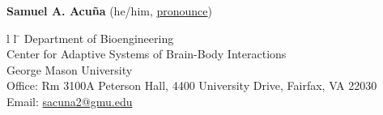 \documentclass[letterpaper, 10pt]{article}
\begin{document}
% 

{\LARGE \textbf{Samuel A. Acuña}}
{\small \hspace{8pt}  (he/him, \href{https://namedrop.io/samuelacuna}{pronounce})}

\begin{tabbing}{l l}
     \hspace{1cm} \= \hspace{10cm} \kill %
     Department of Bioengineering\\
     Center for Adaptive Systems of Brain-Body Interactions\\
     George Mason University\\
     Office: \> Rm 3100A Peterson Hall, 4400 University Drive, Fairfax, VA 22030\\
     Email: \> \href{mailto:sacuna2@gmu.edu}{sacuna2@gmu.edu}
\end{tabbing}



\end{document}
